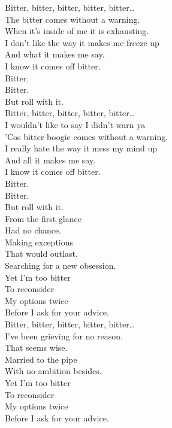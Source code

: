 
Bitter, bitter, bitter, bitter, bitter… \\

The bitter  comes without a warning. \\
When it's inside of me it is exhausting. \\
I don't like the way it makes me freeze up \\
And what it makes me say. \\
I know it comes off bitter. \\
Bitter. \\
Bitter. \\
But roll with it. \\

Bitter, bitter, bitter, bitter, bitter… \\

I wouldn't like to say I didn't warn ya \\
'Cos bitter boogie comes without a warning. \\
I really hate the way it mess my mind up \\
And all it makes me say. \\
I know it comes off bitter. \\
Bitter. \\
Bitter. \\
But roll with it. \\

From the first glance \\
Had no chance. \\
Making exceptions \\
That would outlast. \\
Searching for a new obsession. \\
Yet I'm too bitter \\
To reconsider \\
My options twice \\
Before I ask for your advice. \\

Bitter, bitter, bitter, bitter, bitter… \\

I've been grieving for no reason. \\
That seems wise. \\
Married to the pipe \\
With no ambition besides. \\
Yet I'm too bitter \\
To reconsider \\
My options twice \\
Before I ask for your advice. \\

